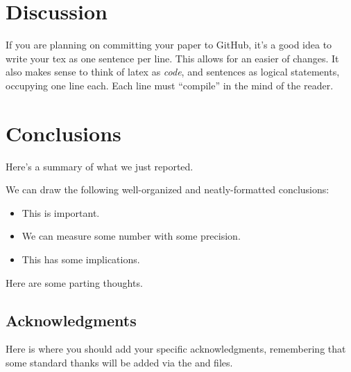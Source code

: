 \documentclass[\docopts]{\docclass}
\begin{document}

\section{Discussion}
\label{sec:discussion}

If you are planning on committing your paper to GitHub, it's a good idea to write your tex as one sentence per line.
This allows for an easier  of changes.
It also makes sense to think of latex as \emph{code}, and sentences as logical statements, occupying one line each.
Each line must ``compile'' in the mind of the reader.



\section{Conclusions}
\label{sec:conclusions}

Here's a summary of what we just reported.

We can draw the following well-organized and neatly-formatted conclusions:
\begin{itemize}
  \item This is important.
  \item We can measure some number with some precision.
  \item This has some implications.
\end{itemize}

Here are some parting thoughts.



\subsection*{Acknowledgments}

Here is where you should add your specific acknowledgments, remembering that some standard thanks will be added via the  and  files.







\end{document}
